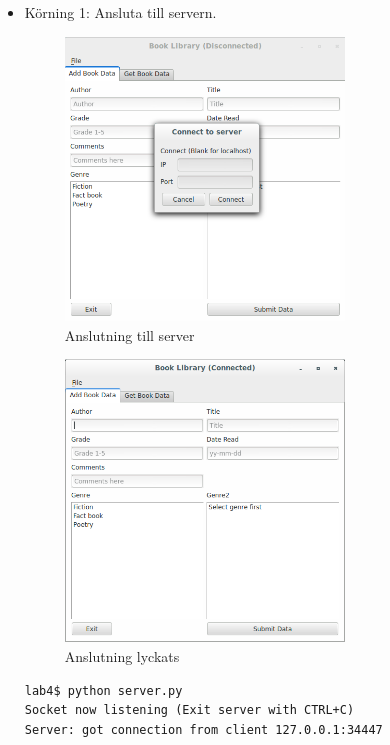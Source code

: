 \documentclass[11pt, titlepage, oneside, a4paper]{article}
\begin{document}
		\newpage
				\begin{itemize}
		 \item Körning 1: Ansluta till servern. 
    \subitem \begin{figure}[h]
    \centering
    \includegraphics[width=0.7\textwidth]{connectToServer.png}
    \caption{Anslutning till server}
    \label{fig:connect}
\end{figure}
\newpage
\begin{figure}[h]
    \centering
    \includegraphics[width=0.7\textwidth]{connectServerSuccess.png}
    \caption{Anslutning lyckats}
    \label{fig:connectServerSuccess}
\end{figure}

\begin{lstlisting}
lab4$ python server.py 
Socket now listening (Exit server with CTRL+C)
Server: got connection from client 127.0.0.1:34447
\end{lstlisting}



\end{itemize}
\end{document}
